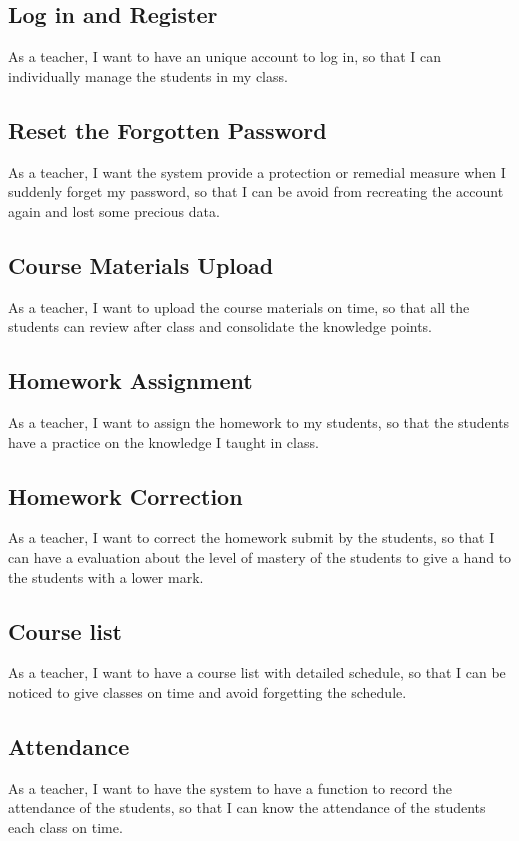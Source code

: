\subsection{Log in and Register}
As a teacher, I want to have an unique account to log in, so that I can individually manage the students in my class.
\subsection{Reset the Forgotten Password}
As a teacher, I want the system provide a protection or remedial measure when I suddenly forget my password, so that I can be avoid from recreating  the account again and lost some precious data.
\subsection{Course Materials Upload}
As a teacher, I want to upload the course materials on time, so that all the students can review after class and consolidate the knowledge points.
\subsection{Homework Assignment}
As a teacher, I want to assign the homework to my students, so that the students have a practice on the knowledge I taught in class.
\subsection{Homework Correction}
As a teacher, I want to correct the homework submit by the students, so that I can have a evaluation about the level of mastery of the students to give a hand to the students with a lower mark. 
\subsection{Course list}
As a teacher, I want to have a course list with detailed schedule, so that I can be noticed to give classes on time and avoid forgetting the schedule.
\subsection{Attendance}
As a teacher, I want to have the system to have a function to record the attendance of the students, so that I can know the attendance of the students each class on time. 
